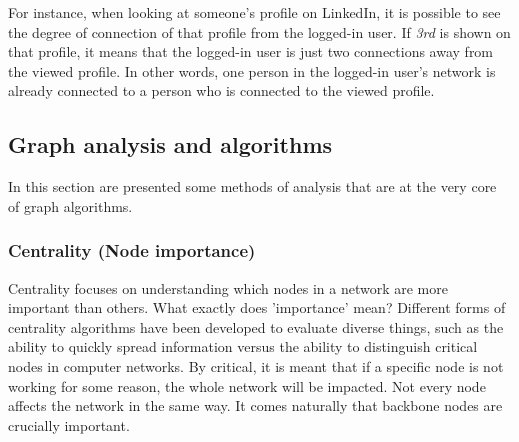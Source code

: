 For instance, when looking at someone's profile on \gls{LinkedIn}, it is possible to see the degree of connection of that profile from the logged-in user.
If \textit{3rd} is shown on that profile, it means that the logged-in user is just two connections away from the viewed profile.
In other words, one person in the logged-in user's network is already connected to a person who is connected to the viewed profile.

\subsection{Graph analysis and algorithms} \label{subsection:LiteratureReview/ShortreviewofGraphTheoryconcepts/Graphanalysisandalgorithms}
In this section are presented some methods of analysis that are at the very core of graph algorithms.

\subsubsection[Centrality (Node importance)]{\gls{Centrality} (\gls{Node importance})} \label{subsubsection:LiteratureReview/ShortreviewofGraphTheoryconcepts/Graphanalysisandalgorithms/CentralityNodeimportance}
\gls{Centrality} focuses on understanding which nodes in a network are more important than others.
What exactly does 'importance' mean?
Different forms of centrality algorithms have been developed to evaluate diverse things, such as the ability to quickly spread information versus the ability to distinguish critical nodes in computer networks.
By critical, it is meant that if a specific node is not working for some reason, the whole network will be impacted.
Not every node affects the network in the same way.
It comes naturally that backbone nodes are crucially important.

